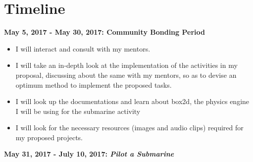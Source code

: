 \documentclass[preprint,12pt]{elsarticle}
\begin{document}







\section{Timeline}
\label{S:1}

\textbf{May 5, 2017 - May 30, 2017: Community Bonding Period}

\begin{itemize}
\item I will interact and consult with my mentors.
\item I will take an in-depth look at the implementation of the activities in my proposal, discussing about the same with my mentors, so as to devise an optimum method to implement the proposed tasks.
\item I will look up the documentations and learn about box2d, the physics engine I will be using for the submarine activity
\item I will look for the necessary resources (images and audio clips) required for my proposed projects.
\end{itemize}

\textbf{May 31, 2017 - July 10, 2017: \textit{Pilot a Submarine}}
\end{document}
